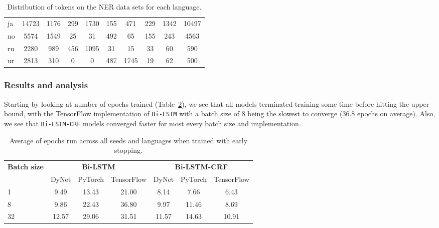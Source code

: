 \begin{table}[h!]
\begin{tabular}{l c c c c c c c c c}
        ja  &14723 & 1176 &
        299 & 1730 &  155 &  471 &  229 & 1342 &10497 \\

        no  & 5574 & 1549 &
         25 &   31 &  492 &   65 &  155 &  243 & 4563 \\

        ru  & 2280 &  989 &
        456 & 1095 &   31 &   15 &   33 &   60 &  590 \\

        ur  & 2813 &  310 &
          0 &    0 &  487 & 1745 &   19 &   62 &  500 \\
        \bottomrule
    \end{tabular}
    \caption{Distribution of tokens on the NER data sets for each language.
    }\label{table:token-distribution-ner}
\end{table}

        

\subsubsection{Results and analysis}

Starting by looking at number of epochs trained
(Table~\ref{table:epochs-run-ner}), we see that all models terminated training
some time before hitting the upper bound, with the TensorFlow implementation of
\texttt{Bi-LSTM} with a batch size of 8 being the slowest to converge (36.8
epochs on average). Also, we see that \texttt{Bi-LSTM-CRF} models converged
faster for most every batch size and implementation.

\begin{table}[h!]
    \centering
    \begin{tabular}{l c c c|c c c}
        \toprule
        \multirow{2}{*}{\bfseries Batch size}     &
        \multicolumn{3}{c}{\bfseries Bi-LSTM}     &
        \multicolumn{3}{c}{\bfseries Bi-LSTM-CRF} \\
        \cmidrule(lr){2-7}
        & DyNet & PyTorch & TensorFlow
        & DyNet & PyTorch & TensorFlow \\
        \cmidrule(lr){1-7}
         1 &  9.49 & 13.43 & 21.00 &  8.14 &  7.66 &  6.43 \\
         8 &  9.86 & 22.43 & 36.80 &  9.97 & 11.46 &  8.69 \\
        32 & 12.57 & 29.06 & 31.51 & 11.57 & 14.63 & 10.91 \\
        \bottomrule
    \end{tabular}
    \caption{Average of epochs run across all seeds and languages when trained
        with early stopping.
        }\label{table:epochs-run-ner}
\end{table}

